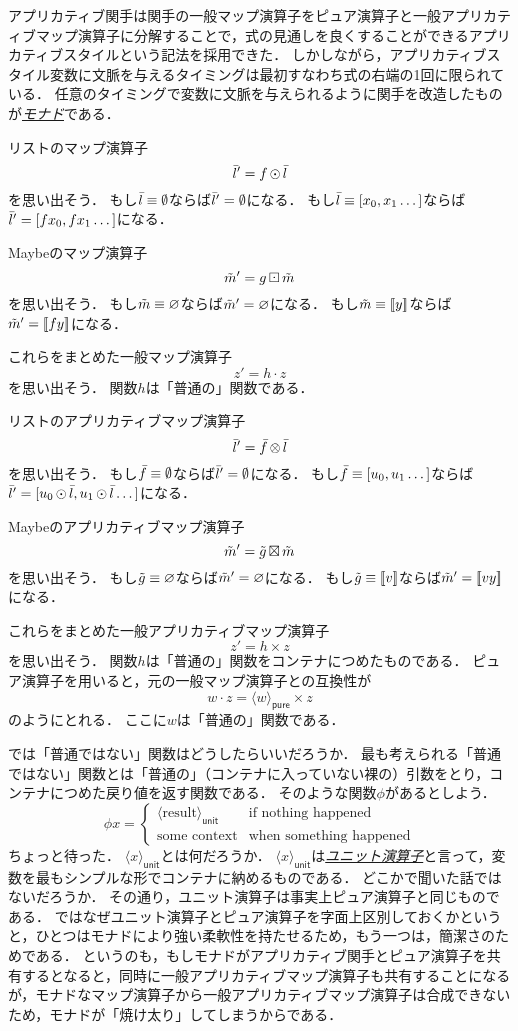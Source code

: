 \documentclass[twocolumn]{jsbook}
\def\[{[\![}
\def\]{]\!]}
\newcommand{\keyword}[1]{\underline{\emph{#1}}}
\DeclareMathOperator{\hsklApplicativeMap}{\times}
\DeclareMathOperator{\hsklApplicativeListMap}{\otimes}
\DeclareMathOperator{\hsklApplicativeMaybeMap}{\boxtimes}
\DeclareMathOperator{\hsklFmap}{\cdot}
\DeclareMathOperator{\hsklMap}{\odot}
\DeclareMathOperator{\hsklMaybeMap}{\boxdot}
\newcommand{\hsklEmptyList}{\emptyset}
\newcommand{\hsklNothing}{\varnothing}
\newcommand{\hsklJust}[1]{\[#1\]}
\newcommand{\hsklList}[1]{\Bar{#1}}
\newcommand{\hsklMaybe}[1]{\Tilde{#1}}
\newcommand{\hsklPure}[1]{\langle#1\rangle_\textsf{pure}}
\newcommand{\hsklUnit}[1]{\langle#1\rangle_\textsf{unit}}
\begin{document}
アプリカティブ関手は関手の一般マップ演算子をピュア演算子と一般アプリカティブマップ演算子に分解することで，式の見通しを良くすることができるアプリカティブスタイルという記法を採用できた．
しかしながら，アプリカティブスタイル変数に文脈を与えるタイミングは最初すなわち式の右端の1回に限られている．
任意のタイミングで変数に文脈を与えられるように関手を改造したものが\keyword{モナド}である．

リストのマップ演算子$$\hsklList{l}'=f\hsklMap\hsklList{l}$$を思い出そう．
もし$\hsklList{l}\equiv\hsklEmptyList$ならば$\hsklList{l}'=\hsklEmptyList$になる．
もし$\hsklList{l}\equiv[x_0,x_1\dots]$ならば$\hsklList{l}'=[fx_0,fx_1\dots]$になる．

Maybeのマップ演算子$$\hsklMaybe{m}'=g\hsklMaybeMap\hsklMaybe{m}$$を思い出そう．
もし$\hsklMaybe{m}\equiv\hsklNothing$ならば$\hsklMaybe{m}'=\hsklNothing$になる．
もし$\hsklMaybe{m}\equiv\hsklJust{y}$ならば$\hsklMaybe{m}'=\hsklJust{fy}$になる．

これらをまとめた一般マップ演算子$$z'=h\hsklFmap z$$を思い出そう．
関数$h$は「普通の」関数である．

リストのアプリカティブマップ演算子$$\hsklList{l}'=\hsklList{f}\hsklApplicativeListMap\hsklList{l}$$を思い出そう．
もし$\hsklList{f}\equiv\hsklEmptyList$ならば$\hsklList{l}'=\hsklEmptyList$になる．
もし$\hsklList{f}\equiv[u_0,u_1\dots]$ならば$\hsklList{l}'=[u_0\hsklMap\hsklList{l},u_1\hsklMap\hsklList{l}\dots]$になる．

Maybeのアプリカティブマップ演算子$$\hsklMaybe{m}'=\hsklMaybe{g}\hsklApplicativeMaybeMap\hsklMaybe{m}$$を思い出そう．
もし$\hsklMaybe{g}\equiv\hsklNothing$ならば$\hsklMaybe{m}'=\hsklNothing$になる．
もし$\hsklMaybe{g}\equiv\hsklJust{v}$ならば$\hsklMaybe{m}'=\hsklJust{vy}$になる．

これらをまとめた一般アプリカティブマップ演算子$$z'=h\hsklApplicativeMap z$$を思い出そう．
関数$h$は「普通の」関数をコンテナにつめたものである．
ピュア演算子を用いると，元の一般マップ演算子との互換性が$$w\hsklFmap z=\hsklPure{w}\hsklApplicativeMap z$$のようにとれる．
ここに$w$は「普通の」関数である．

では「普通ではない」関数はどうしたらいいだろうか．
最も考えられる「普通ではない」関数とは「普通の」（コンテナに入っていない裸の）引数をとり，コンテナにつめた戻り値を返す関数である．
そのような関数$\phi$があるとしよう．
$$\phi x=\begin{cases}\hsklUnit{\text{result}}&\text{if nothing happened}\\
\text{some context}&\text{when something happened}\end{cases}$$
ちょっと待った．
$\hsklUnit{x}$とは何だろうか．
$\hsklUnit{x}$は\keyword{ユニット演算子}と言って，変数を最もシンプルな形でコンテナに納めるものである．
どこかで聞いた話ではないだろうか．
その通り，ユニット演算子は事実上ピュア演算子と同じものである．
ではなぜユニット演算子とピュア演算子を字面上区別しておくかというと，ひとつはモナドにより強い柔軟性を持たせるため，もう一つは，簡潔さのためである．
というのも，もしモナドがアプリカティブ関手とピュア演算子を共有するとなると，同時に一般アプリカティブマップ演算子も共有することになるが，モナドなマップ演算子から一般アプリカティブマップ演算子は合成できないため，モナドが「焼け太り」してしまうからである．
\end{document}

